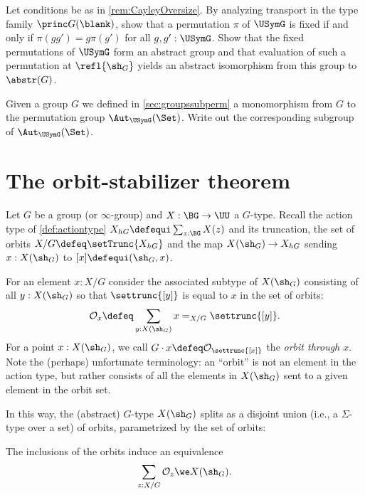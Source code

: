 \begin{xca}\label{xca:PP-fixed-permutations} 
Let conditions be as in \cref{rem:CayleyOversize}.
By analyzing transport in the type family $\princ G(\blank)$,
show that a permutation $\pi$ of $\USymG$
is fixed if and only if $\pi(gg')=g\pi(g')$ for all $g,g':\USymG$.
Show that the fixed permutations of $\USymG$ form an abstract group
and that evaluation of such a permutation at $\refl{\sh_G}$
yields an abstract isomorphism from this group to $\abstr(G)$.
\end{xca}
  

\begin{xca} 
    Given a group $G$ we defined in \cref{sec:groupssubperm} a monomorphism from $G$ to the permutation group $\Aut_{\USymG}(\Set)$. Write out the corresponding subgroup of $\Aut_{\USymG}(\Set)$.
  \end{xca}

\section{The orbit-stabilizer theorem}
\label{sec:orbit-stabilizer-theorem}


Let $G$ be a group (or $\infty$-group) and  $X : \BG \to \UU$  a $G$-type.
Recall the action type of \cref{def:actiontype} $X_{hG}\defequi
\sum_{z:\BG}X(z)$ and its truncation, the set of orbits $X / G \defeq \setTrunc{X_{hG}}$ and the map $X(\sh_G)\to X_{hG}$ sending $x:X(\sh_G)$ to $[x]\defequi (\sh_G,x)$.


For an element $x:X/G$ consider the associated subtype of $X(\sh_G)$ consisting of
 all $y : X(\sh_G)$ so that $\settrunc{[y]}$ is equal to $x$ in the set of orbits:
\[
  \mathcal O_{x} \defeq \sum_{y : X(\sh_G)} x =_{X/G} \settrunc{[y]}.
\]
 For a point $x : X(\sh_G)$, we call $G\cdot x \defeq \mathcal O_{\settrunc{[x]}}$ 
 the \emph{orbit through $x$}.
Note the (perhaps) unfortunate terminology: an ``orbit'' is not an element in the
action type, but rather consists of all the elements in $X(\sh_G)$ sent to a given element in the orbit set.

In this way, the (abstract) $G$-type $X(\sh_G)$ splits as a disjoint union (i.e., a $\Sigma$-type over a set) of orbits,
parametrized by the set of orbits:
\begin{lemma}
  \label{old:splitting into orbits}
  The inclusions of the orbits induce an equivalence 
\[
  \sum_{z : X / G} \mathcal O_z  \we X(\sh_G).
\]
\end{lemma}

